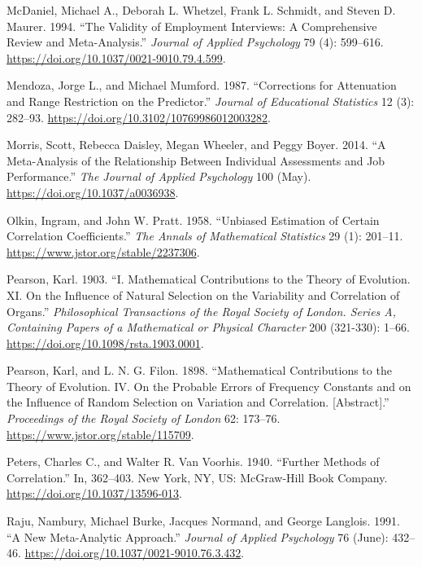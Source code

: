 \documentclass[
  letterpaper,
  DIV=11,
  numbers=noendperiod]{scrreprt}
\newlength{\cslhangindent}
\newlength{\cslentryspacingunit} %
\newenvironment{CSLReferences}[2] %
 {%
  \setlength{\parindent}{0pt}
  \ifodd #1
  \let\oldpar\par
  \def\par{\hangindent=\cslhangindent\oldpar}
  \fi
  \setlength{\parskip}{#2\cslentryspacingunit}
 }%
 {}
\begin{document}
\begin{CSLReferences}{1}{0}
\leavevmode{}%
McDaniel, Michael A., Deborah L. Whetzel, Frank L. Schmidt, and Steven
D. Maurer. 1994. {``The Validity of Employment Interviews: A
Comprehensive Review and Meta-Analysis.''} \emph{Journal of Applied
Psychology} 79 (4): 599--616.
\url{https://doi.org/10.1037/0021-9010.79.4.599}.

\leavevmode{}%
Mendoza, Jorge L., and Michael Mumford. 1987. {``Corrections for
Attenuation and Range Restriction on the Predictor.''} \emph{Journal of
Educational Statistics} 12 (3): 282--93.
\url{https://doi.org/10.3102/10769986012003282}.

\leavevmode{}%
Morris, Scott, Rebecca Daisley, Megan Wheeler, and Peggy Boyer. 2014.
{``A Meta-Analysis of the Relationship Between Individual Assessments
and Job Performance.''} \emph{The Journal of Applied Psychology} 100
(May). \url{https://doi.org/10.1037/a0036938}.

\leavevmode{}%
Olkin, Ingram, and John W. Pratt. 1958. {``Unbiased Estimation of
Certain Correlation Coefficients.''} \emph{The Annals of Mathematical
Statistics} 29 (1): 201--11. \url{https://www.jstor.org/stable/2237306}.

\leavevmode{}%
Pearson, Karl. 1903. {``I. Mathematical Contributions to the Theory of
Evolution. {\textemdash}XI. On the Influence of Natural Selection on the
Variability and Correlation of Organs.''} \emph{Philosophical
Transactions of the Royal Society of London. Series A, Containing Papers
of a Mathematical or Physical Character} 200 (321-330): 1--66.
\url{https://doi.org/10.1098/rsta.1903.0001}.

\leavevmode{}%
Pearson, Karl, and L. N. G. Filon. 1898. {``Mathematical Contributions
to the Theory of Evolution. IV. On the Probable Errors of Frequency
Constants and on the Influence of Random Selection on Variation and
Correlation. {[}Abstract{]}.''} \emph{Proceedings of the Royal Society
of London} 62: 173--76. \url{https://www.jstor.org/stable/115709}.

\leavevmode{}%
Peters, Charles C., and Walter R. Van Voorhis. 1940. {``Further Methods
of Correlation.''} In, 362--403. New York, NY, US: McGraw-Hill Book
Company. \url{https://doi.org/10.1037/13596-013}.

\leavevmode{}%
Raju, Nambury, Michael Burke, Jacques Normand, and George Langlois.
1991. {``A New Meta-Analytic Approach.''} \emph{Journal of Applied
Psychology} 76 (June): 432--46.
\url{https://doi.org/10.1037/0021-9010.76.3.432}.


\end{CSLReferences}
\end{document}
